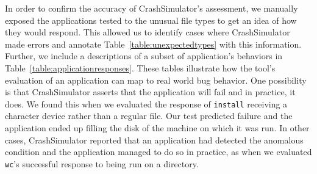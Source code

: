 \begin{table}[t]
    \scriptsize{}
    \caption{Responses of a sample of coreutils applications when exposed to
      anomalous conditions.  The character device used was the infinite-length {\tt
        /dev/urandom}.}
    \label{table:applicationresponses}
\end{table}

In order to confirm the accuracy of CrashSimulator's assessment, we manually
exposed the applications tested to the unusual
file types to get an idea of how they would respond.
This allowed us to identify cases where CrashSimulator made errors and
annotate Table~\ref{table:unexpectedtypes} with this information.  Further,
we include a descriptions of a subset of application's behaviors in
Table~\ref{table:applicationresponses}.
These tables illustrate how the tool's
evaluation of an application can map to real world bug behavior.
One possibility is that CrashSimulator asserts
that the application will fail
and in practice, it does.  We found this when we evaluated
the response of  {\tt install} receiving a character device
rather than a regular file. Our test predicted failure and the
application ended up filling the disk of the machine on which it was run.
In other cases, CrashSimulator reported that an
application had detected the anomalous condition and the application managed to
do so in practice,  as when we evaluated {\tt wc}'s successful response to
being run on a directory.

